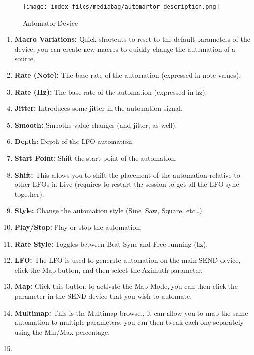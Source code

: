 \documentclass[
  letterpaper,
  DIV=11,
  numbers=noendperiod]{scrreport}
\providecommand{\tightlist}{%
  \setlength{\itemsep}{0pt}\setlength{\parskip}{0pt}}\usepackage{longtable,booktabs,array}
\begin{document}
\begin{figure}

{\centering \texttt{[image: index\_files/mediabag/automartor\_description.png]}

}

\caption{Automator Device}

\end{figure}

\begin{enumerate}
\def\labelenumi{\arabic{enumi}.}
\tightlist
\item
  \textbf{Macro Variations:} Quick shortcuts to reset to the default
  parameters of the device, you can create new macros to quickly change
  the automation of a source.
\item
  \textbf{Rate (Note):} The base rate of the automation (expressed in
  note values).
\item
  \textbf{Rate (Hz):} The base rate of the automation (expressed in hz).
\item
  \textbf{Jitter:} Introduces some jitter in the automation signal.
\item
  \textbf{Smooth:} Smooths value changes (and jitter, as well).
\item
  \textbf{Depth:} Depth of the LFO automation.
\item
  \textbf{Start Point:} Shift the start point of the automation.
\item
  \textbf{Shift:} This allows you to shift the placement of the
  automation relative to other LFOs in Live (requires to restart the
  session to get all the LFO sync together).
\item
  \textbf{Style:} Change the automation style (Sine, Saw, Square,
  etc\ldots).
\item
  \textbf{Play/Stop:} Play or stop the automation.
\item
  \textbf{Rate Style:} Toggles between Beat Sync and Free running (hz).
\item
  \textbf{LFO:} The LFO is used to generate automation on the main SEND
  device, click the Map button, and then select the Azimuth parameter.
\item
  \textbf{Map:} Click this button to activate the Map Mode, you can then
  click the parameter in the SEND device that you wish to automate.
\item
  \textbf{Multimap:} This is the Multimap browser, it can allow you to
  map the same automation to multiple parameters, you can then tweak
  each one separately using the Min/Max percentage.
\item

\end{enumerate}
\end{document}
